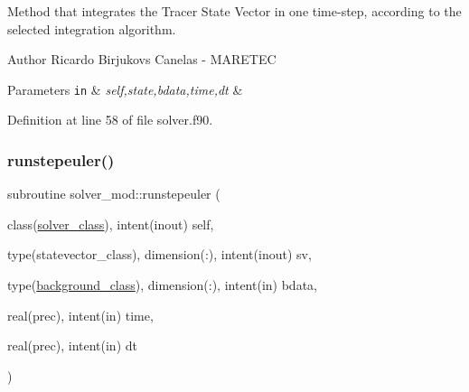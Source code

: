 Method that integrates the Tracer State Vector in one time-\/step, according to the selected integration algorithm. 

\begin{DoxyAuthor}{Author}
Ricardo Birjukovs Canelas -\/ M\+A\+R\+E\+T\+EC 
\end{DoxyAuthor}

\begin{DoxyParams}[1]{Parameters}
\mbox{\tt in}  & {\em self,state,bdata,time,dt} & \\
\hline
\end{DoxyParams}


Definition at line 58 of file solver.\+f90.


\mbox{\label{namespacesolver__mod_a21533e195501ebb46c1814aeaede4c55}} 
\subsubsection{\texorpdfstring{runstepeuler()}{runstepeuler()}}
{\footnotesize\ttfamily subroutine solver\+\_\+mod\+::runstepeuler (\begin{DoxyParamCaption}\item[{class(\mbox{\hyperlink{structsolver__mod_1_1solver__class}{solver\+\_\+class}}), intent(inout)}]{self,  }\item[{type(statevector\+\_\+class), dimension(\+:), intent(inout)}]{sv,  }\item[{type(\mbox{\hyperlink{structbackground__mod_1_1background__class}{background\+\_\+class}}), dimension(\+:), intent(in)}]{bdata,  }\item[{real(prec), intent(in)}]{time,  }\item[{real(prec), intent(in)}]{dt }\end{DoxyParamCaption})\hspace{0.3cm}{\ttfamily [private]}}



